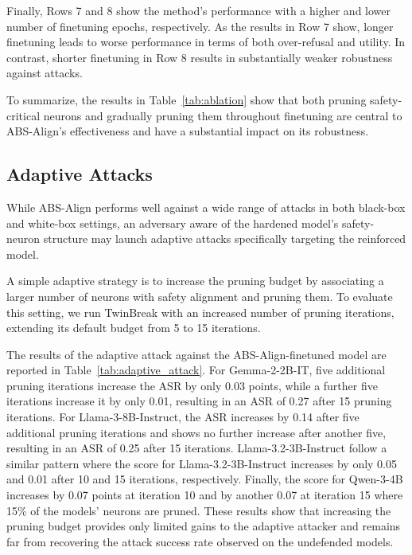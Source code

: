 Finally, Rows 7 and 8 show the method's performance with a higher and lower number of finetuning epochs, respectively. As the results in Row 7 show, longer finetuning leads to worse performance in terms of both over-refusal and utility. In contrast, shorter finetuning in Row 8 results in substantially weaker robustness against attacks.

To summarize, the results in Table~\ref{tab:ablation} show that both pruning safety-critical neurons and gradually pruning them throughout finetuning are central to ABS-Align's effectiveness and have a substantial impact on its robustness.



\subsection{Adaptive Attacks}
\label{subsec:adaptive_attacks}

While ABS-Align performs well against a wide range of attacks in both black-box and white-box settings, an adversary aware of the hardened model's safety-neuron structure may launch adaptive attacks specifically targeting the reinforced model.

A simple adaptive strategy is to increase the pruning budget by associating a larger number of neurons with safety alignment and pruning them. To evaluate this setting, we run TwinBreak with an increased number of pruning iterations, extending its default budget from 5 to 15 iterations.



The results of the adaptive attack against the ABS-Align-finetuned model are reported in Table~\ref{tab:adaptive_attack}. For Gemma-2-2B-IT, five additional pruning iterations increase the ASR by only 0.03 points, while a further five iterations increase it by only 0.01, resulting in an ASR of 0.27 after 15 pruning iterations. For Llama-3-8B-Instruct, the ASR increases by 0.14 after five additional pruning iterations and shows no further increase after another five, resulting in an ASR of 0.25 after 15 iterations. Llama-3.2-3B-Instruct follow a similar pattern where the score for Llama-3.2-3B-Instruct increases by only 0.05 and 0.01 after 10 and 15 iterations, respectively. Finally, the score for Qwen-3-4B increases by 0.07 points at iteration 10 and by another 0.07 at iteration 15 where 15\% of the models' neurons are pruned. These results show that increasing the pruning budget provides only limited gains to the adaptive attacker and remains far from recovering the attack success rate observed on the undefended models.